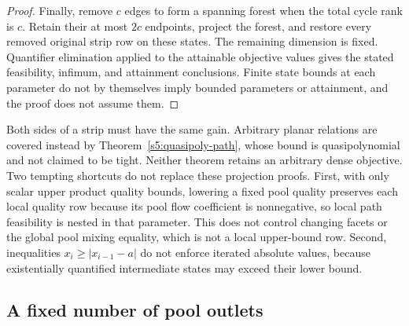 \begin{proof}
Finally, remove $c$ edges to form a spanning forest when the total cycle
rank is $c$. Retain their at most $2c$ endpoints, project the forest,
and restore every removed original strip row on these states. The
remaining dimension is fixed. Quantifier elimination applied to the
attainable objective values gives the stated feasibility, infimum, and
attainment conclusions. Finite state bounds at each parameter do not
by themselves imply bounded parameters or attainment, and the proof does
not assume them.
\end{proof}

Both sides of a strip must have the same gain. Arbitrary planar
relations are covered instead by Theorem~\ref{s5:quasipoly-path}, whose bound
is quasipolynomial and not claimed to be tight. Neither theorem
retains an arbitrary dense objective. Two tempting shortcuts do not
replace these projection proofs. First, with only scalar upper product
quality bounds, lowering a fixed pool quality preserves each local
quality row because its pool flow coefficient is nonnegative, so
local path feasibility is nested in that parameter. This does not
control changing facets or the global pool mixing equality, which is
not a local upper-bound row. Second, inequalities
$x_i\ge|x_{i-1}-a|$ do not enforce iterated absolute values, because
existentially quantified intermediate states may exceed their lower bound.

\subsection{A fixed number of pool outlets}\label{s5:fixed-outlets}

